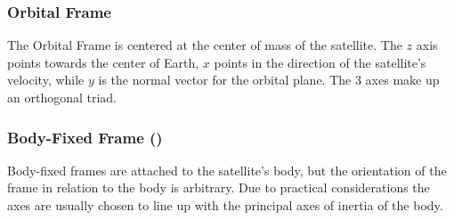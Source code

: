 \subsubsection{Orbital Frame}

The Orbital Frame is centered at the center of mass of the satellite. The $z$ axis points towards the center of Earth, $x$ points in the direction of the satellite's velocity, while $y$ is the normal vector for the orbital plane. The 3 axes make up an orthogonal triad.


\subsubsection{Body-Fixed Frame ()}

Body-fixed frames are attached to the satellite's body, but the orientation of the frame in relation to the body is arbitrary. Due to practical considerations the axes are usually chosen to line up with the principal axes of inertia of the body.

